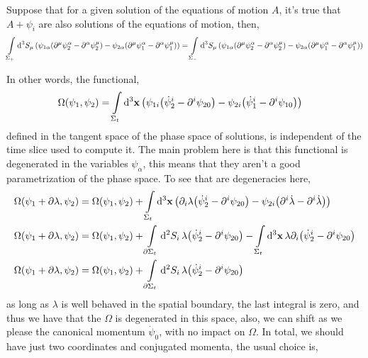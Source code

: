 Suppose that for a given solution of the equations of motion $A$, it's true that $A+\psi_i$ are also solutions of the 
equations of motion, then,
\begin{align}
    \int\limits_{\Sigma_+}\dd[3]{S_{\mu}}\qty(\psi_{1\alpha}\qty(\partial^\mu\psi_{2}^\alpha-\partial^\alpha\psi_{2}^\mu)-\psi_{2\alpha}\qty(\partial^\mu\psi_{1}^\alpha-\partial^\alpha\psi_{1}^\mu))=\int\limits_{\Sigma_-}\dd[3]{S_{\mu}}\qty(\psi_{1\alpha}\qty(\partial^\mu\psi_{2}^\alpha-\partial^\alpha\psi_{2}^\mu)-\psi_{2\alpha}\qty(\partial^\mu\psi_{1}^\alpha-\partial^\alpha\psi_{1}^\mu))
\end{align}

In other words, the functional,
\begin{align}
    \Omega\qty(\psi_1,\psi_2) &= \int\limits_{\Sigma_t}\dd[3]{\vb x}\qty(\psi_{1i}\qty(\dot\psi_2^i-\partial^i\psi_{20})-\psi_{2i}\qty(\dot\psi_1^i-\partial^i\psi_{10}))
\end{align}
defined in the tangent space of the phase space of solutions, is independent of the time slice used to compute it. The main 
problem here is that this functional is degenerated in the variables $\psi_\alpha$, this means that they aren't a good parametrization 
of the phase space. To see that are degeneracies here, 
\begin{align}
    \Omega\qty(\psi_1+\partial\lambda,\psi_2) &= \Omega\qty(\psi_1,\psi_2)+\int\limits_{\Sigma_t}\dd[3]{\vb x}\qty(\partial_i\lambda\qty(\dot\psi_2^i-\partial^i\psi_{20})-\psi_{2i}\qty(\partial^i\dot\lambda-\partial^i\dot\lambda))\\
    \Omega\qty(\psi_1+\partial\lambda,\psi_2) &= \Omega\qty(\psi_1,\psi_2)+\int\limits_{\partial\Sigma_t}\dd[2]{S_i}\lambda\qty(\dot\psi_2^i-\partial^i\psi_{20})-\int\limits_{\Sigma_t}\dd[3]{\vb x}\lambda\partial_i\qty(\dot\psi_2^i-\partial^i\psi_{20})\\
    \Omega\qty(\psi_1+\partial\lambda,\psi_2) &= \Omega\qty(\psi_1,\psi_2)+\int\limits_{\partial\Sigma_t}\dd[2]{S_i}\lambda\qty(\dot\psi_2^i-\partial^i\psi_{20})
\end{align}
as long as $\lambda$ is well behaved in the spatial boundary, the last integral is zero, and thus we have that the $\Omega$ is 
degenerated in this space, also, we can shift as we please the canonical momentum $\dot\psi_0$, with no impact on $\Omega$. In 
total, we should have just two coordinates and conjugated momenta, the usual choice is,








